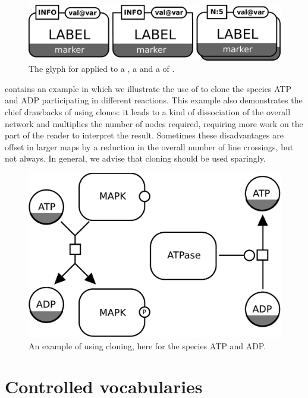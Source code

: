 \begin{figure}[H]
  \centering
  \includegraphics[scale = 0.3]{images/labeledCloneMarker}
  \caption{The \PD glyph for  applied to a , a  and a  of .}
  \label{fig:labeledCloneMarker}
\end{figure}

 contains an example in which we illustrate the use of  to clone the species ATP and ADP participating in different reactions.  This example also demonstrates the chief drawbacks of using clones: it leads to a kind of dissociation of the overall network and multiplies the number of nodes required, requiring more work on the part of the reader to interpret the result.  Sometimes these disadvantages are offset in larger maps by a reduction in the overall number of line crossings, but not always.  In general, we advise that cloning should be used sparingly.

\begin{figure}[H]
  \centering
  \includegraphics[scale = 0.5]{examples/cloning}
  \caption{An example of using cloning, here for the species ATP and ADP.}
  \label{fig:example-cloning}
\end{figure}

\section{Controlled vocabularies}\label{sec:CVs}

